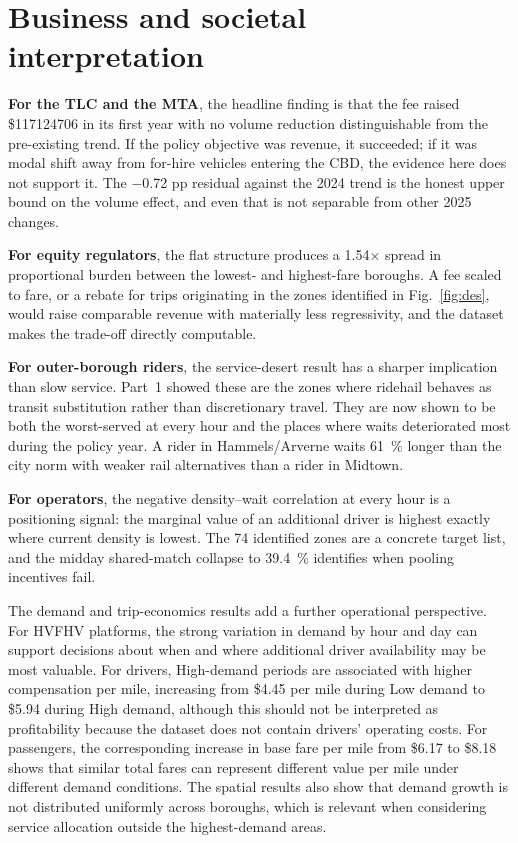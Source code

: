 \documentclass[10pt,a4paper]{article}
\begin{document}
\section{Business and societal interpretation}

\textbf{For the TLC and the MTA}, the headline finding is that the fee raised \$\num{117124706} in its first year with no volume reduction distinguishable from the pre-existing trend. If the policy objective was revenue, it succeeded; if it
was modal shift away from for-hire vehicles entering the CBD, the evidence here does not support it. The \num{-0.72} pp residual against the 2024 trend is the
honest upper bound on the volume effect, and even that is not separable from other 2025 changes.

\textbf{For equity regulators}, the flat structure produces a \num{1.54}$\times$
spread in proportional burden between the lowest- and highest-fare boroughs. A
fee scaled to fare, or a rebate for trips originating in the zones identified in
Fig.~\ref{fig:des}, would raise comparable revenue with materially less
regressivity, and the dataset makes the trade-off directly computable.

\textbf{For outer-borough riders}, the service-desert result has a sharper
implication than slow service. Part~1 showed these are the zones where ridehail
behaves as transit substitution rather than discretionary travel. They are now
shown to be both the worst-served at every hour and the places where waits
deteriorated most during the policy year. A rider in Hammels/Arverne waits
\SI{61}{\percent} longer than the city norm with weaker rail alternatives than a
rider in Midtown.

\textbf{For operators}, the negative density--wait correlation at every hour is a
positioning signal: the marginal value of an additional driver is highest exactly
where current density is lowest. The 74 identified zones are a concrete target list, and the midday shared-match collapse to \SI{39.4}{\percent} identifies when
pooling incentives fail.

The demand and trip-economics results add a further operational
perspective. For HVFHV platforms, the strong variation in demand by
hour and day can support decisions about when and where additional
driver availability may be most valuable. For drivers, High-demand
periods are associated with higher compensation per mile, increasing
from \$4.45 per mile during Low demand to \$5.94 during High demand,
although this should not be interpreted as profitability because the
dataset does not contain drivers' operating costs. For passengers,
the corresponding increase in base fare per mile from \$6.17 to
\$8.18 shows that similar total fares can represent different value
per mile under different demand conditions. The spatial results also
show that demand growth is not distributed uniformly across boroughs,
which is relevant when considering service allocation outside the
highest-demand areas.
\end{document}
